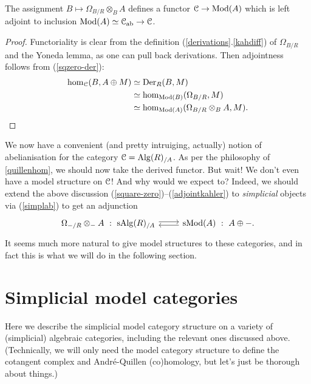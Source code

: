\begin{proposition}
  \label{adjointkahler}
  The assignment $B \mapsto \Omega_{B/R} \otimes_B A$ defines a
  functor $\mathcal{C} \to \mathrm{Mod}(A)$ which is left adjoint to inclusion $\mathrm{Mod}(A)
  \simeq \mathcal{C}_{\operatorname{ab}} \to \mathcal{C}$.
\end{proposition}

\begin{proof}
  Functoriality is clear from the definition
  (\ref{derivations}.\ref{kahdiff}) of $\Omega_{B/R}$ and the Yoneda
  lemma, as one can pull back derivations. Then adjointness follows
  from (\ref{sqzero-der}):
  \begin{align*}
  \operatorname{hom}_{\mathcal{C}}(B, A \oplus M) &\simeq \operatorname{Der}_R(B,M) \\ &\simeq
  \operatorname{hom}_{\mathrm{Mod}(B)}(\Omega_{B/R}, M) \\ &\simeq
  \operatorname{hom}_{\mathrm{Mod}(A)}(\Omega_{B/R} \otimes_B A, M). \qedhere
  \end{align*}
\end{proof}

\begin{nothing}
  We now have a convenient (and pretty intruiging, actually) notion of
  abelianisation for the category $\mathcal{C} = \mathrm{Alg}(R)_{/A}$. As per the
  philosophy of \textsection \ref{quillenhom}, we should now take the
  derived functor. But wait! We don't even have a model structure on
  $\mathcal{C}$! And why would we expect to? Indeed, we should extend the above
  discussion (\ref{square-zero})--(\ref{adjointkahler}) to
  \emph{simplicial} objects via (\ref{simplab}) to get an adjunction
  \[
  \begin{tikzcd}
    \Omega_{-/R} \otimes_- A \ : \ \s\Alg(R)_{/A} \rar[yshift=2pt] &
    \s\Mod(A) \ :\ A \oplus -. \lar[yshift=-2pt]
  \end{tikzcd}
  \]
  It seems much more natural to give model structures to these
  categories, and in fact this is what we will do in the following
  section.
\end{nothing}


\section{Simplicial model categories}

Here we describe the simplicial model category structure on a variety
of (simplicial) algebraic categories, including the relevant ones
discussed above. (Technically, we will only need the model category
structure to define the cotangent complex and Andr\'e-Quillen
(co)homology, but let's just be thorough about things.)

